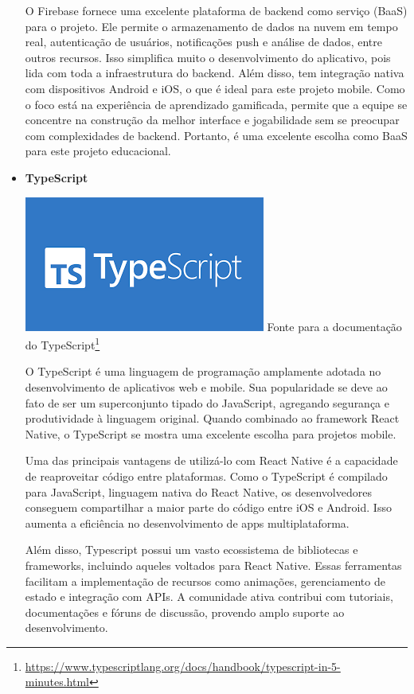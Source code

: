 \begin{itemize}
O Firebase fornece uma excelente plataforma de backend como serviço (BaaS) para o projeto. Ele permite o armazenamento de dados na nuvem em tempo real, autenticação de usuários, notificações push e análise de dados, entre outros recursos. Isso simplifica muito o desenvolvimento do aplicativo, pois lida com toda a infraestrutura do backend. Além disso, tem integração nativa com dispositivos Android e iOS, o que é ideal para este projeto mobile. Como o foco está na experiência de aprendizado gamificada, permite que a equipe se concentre na construção da melhor interface e jogabilidade sem se preocupar com complexidades de backend. Portanto, é uma excelente escolha como BaaS para este projeto educacional.
    \item \textbf{TypeScript}
    \begin{center}
    \includegraphics[width=0.5\linewidth]{figuras/TypeScript.png}
    \label{fig:TypeScript}
    Fonte para a documentação do TypeScript\footnote{\url{https://www.typescriptlang.org/docs/handbook/typescript-in-5-minutes.html}}
\end{center}

O TypeScript é uma linguagem de programação amplamente adotada no desenvolvimento de aplicativos web e mobile. Sua popularidade se deve ao fato de ser um superconjunto tipado do JavaScript, agregando segurança e produtividade à linguagem original. Quando combinado ao framework React Native, o TypeScript se mostra uma excelente escolha para projetos mobile.

Uma das principais vantagens de utilizá-lo com React Native é a capacidade de reaproveitar código entre plataformas. Como o TypeScript é compilado para JavaScript, linguagem nativa do React Native, os desenvolvedores conseguem compartilhar a maior parte do código entre iOS e Android. Isso aumenta a eficiência no desenvolvimento de apps multiplataforma.

Além disso, Typescript possui um vasto ecossistema de bibliotecas e frameworks, incluindo aqueles voltados para React Native. Essas ferramentas facilitam a implementação de recursos como animações, gerenciamento de estado e integração com APIs. A comunidade ativa contribui com tutoriais, documentações e fóruns de discussão, provendo amplo suporte ao desenvolvimento.


\end{itemize}
